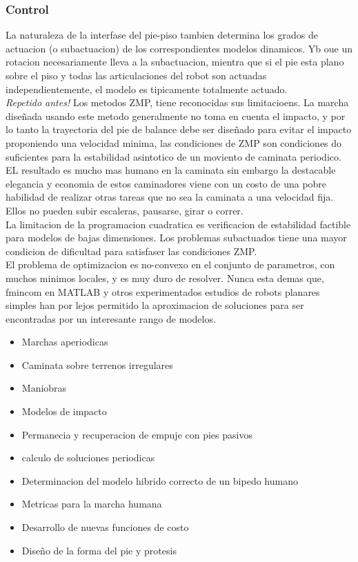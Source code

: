 \documentclass[10pt,onecolumn,twoside,letterpaper]{article}
\begin{document}
\subsubsection{Control}
La naturaleza de la interfase del pie-piso tambien determina los grados de actuacion (o subactuacion) de los correspondientes modelos dinamicos. Yb oue un rotacion necesariamente lleva a la subactuacion, mientra que si el pie esta plano sobre el piso y todas las articulaciones del robot son actuadas independientemente, el modelo es tipicamente totalmente actuado.\cite{Grizzle2014}\\
\emph{Repetido antes!} Los metodos ZMP, tiene reconocidas sus limitacioens. La marcha dise\~nada usando este metodo generalmente no toma en cuenta el impacto, y por lo tanto la trayectoria del pie de balance debe ser dise\~nado para evitar el impacto proponiendo una velocidad minima, las condiciones de ZMP son condiciones do suficientes para la estabilidad asintotico de un moviento de caminata periodico.\\
EL resultado es mucho mas humano en la caminata sin embargo la destacable elegancia y economia de estos caminadores viene con un costo de una pobre habilidad de realizar otras tareas que no sea la caminata a una velocidad fija. Ellos no pueden subir escaleras, pausarse, girar o correr.\\
La limitacion de la programacion cuadratica es verificacion de estabilidad factible para modelos de bajas dimensiones. Los problemas subactuados tiene una mayor condicion de dificultad para satisfaser las condiciones ZMP.\\
El problema de optimizacion es no-convexo en el conjunto de parametros, con muchos minimos locales, y es muy duro de resolver. Nunca esta demas que, fmincom en MATLAB y otros experimentados estudios de robots planares simples han por lejos permitido la aproximacion de soluciones para ser encontradas por un interesante rango de modelos.\cite{Grizzle2014}\\
\begin{itemize}
\item Marchas aperiodicas
\item Caminata sobre terrenos irregulares
\item Maniobras
\item Modelos de impacto
\item Permanecia y  recuperacion de empuje con pies pasivos
\item calculo de soluciones periodicas
\item Determinacion del modelo hibrido correcto de un bipedo humano
\item Metricas para la marcha humana
\item Desarrollo de nuevas funciones de costo
\item Dise\~no de la forma del pie y protesis
\end{itemize}
\end{document}
